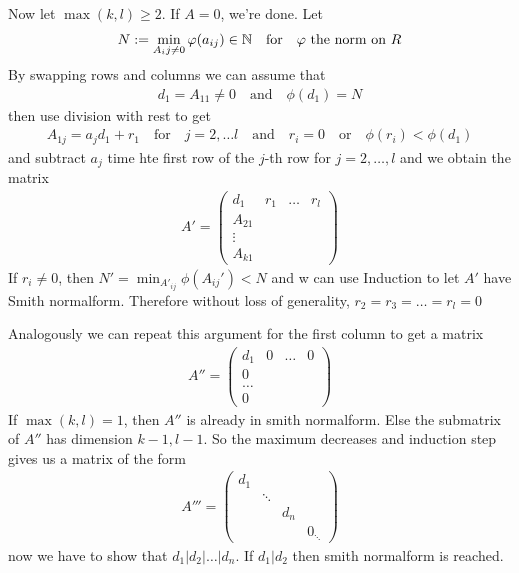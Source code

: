 Now let $\max(k,l) \geq 2$. If $A = 0$, we're done. Let
\begin{align*}
	N := \min_{A_ij \neq 0} \varphi(a_{ij}) \in \mathbb{N} \quad \text{for} \quad  \varphi \text{ the norm on $R$}
\end{align*}
By swapping rows and columns we can assume that 
\begin{align*}
	d_1 = A_{11} \neq 0 \quad \text{and} \quad \phi(d_1) = N
\end{align*}
then use division with rest to get
\begin{align*}
	A_{1j} = a_j d_1 + r_1 \quad \text{for} \quad j = 2, \ldots l \quad \text{and} \quad r_i = 0 \quad \text{or} \quad \phi(r_i) < \phi(d_1)
\end{align*}
and subtract $a_j$ time hte first row of the $j$-th row for $j = 2, \ldots, l$ and we obtain the matrix
\begin{align*}
	A' = \begin{pmatrix}
	d_1 & r_1 & \ldots & r_l\\
	A_{21} &  &  & \\
	\vdots &  &  & \\
	A_{k1} &  &  & 
	\end{pmatrix}
\end{align*}
If $r_i \neq 0$, then $N' = \min_{A'_{ij}} \phi(A_{ij}') < N$ and w can use Induction to let $A'$ have Smith normalform. Therefore without loss of generality, $r_2 = r_3 = \ldots = r_l = 0$

Analogously we can repeat this argument for the first column to get a matrix
\begin{align*}
	A'' = \begin{pmatrix}
	d_1 & 0 & \ldots & 0\\
	0 &  &  & \\
	\ldots &  &  & \\
	0 &  &  & 
	\end{pmatrix}
\end{align*}
If $\max(k,l) = 1$, then $A''$ is already in smith normalform. Else the submatrix of $A''$ has dimension $k-1,l-1$. So the maximum decreases and induction step gives us a matrix of the form
\begin{align*}
	A''' = \begin{pmatrix}
	d_1 &  &  & \\
	 & \ddots &  & \\
	 &  & d_n & \\
	 &  &  & 0_{\ddots}
	\end{pmatrix}
\end{align*}
now we have to show that $d_1|d_2|\ldots|d_n$. If $d_1|d_2$ then smith normalform is reached.

